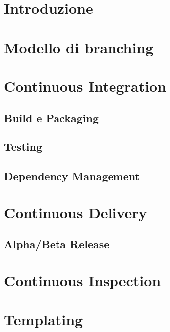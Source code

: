 
\section{Introduzione}

\section{Modello di branching}

\section{Continuous Integration}
\subsection{Build e Packaging}

\subsection{Testing}

\subsection{Dependency Management}

\section{Continuous Delivery}

\subsection{Alpha/Beta Release}

\section{Continuous Inspection}

\section{Templating}
